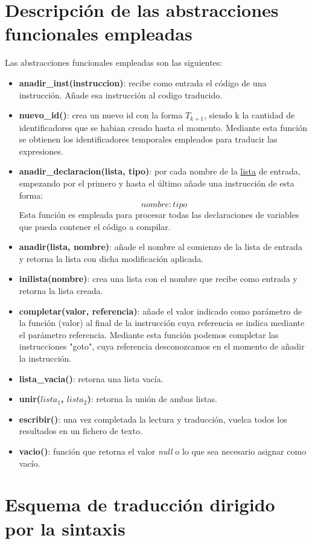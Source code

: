 \documentclass[12pt,a4paper,landscape]{article}
\theoremstyle{mytheor}
\begin{document}
\newpage
\section{Descripción de las abstracciones funcionales empleadas}
Las abstracciones funcionales empleadas son las siguientes:
\begin{itemize}
  \item \textbf{anadir\_inst(instruccion)}: recibe como entrada el código de una instrucción. Añade esa instrucción al codigo traducido.
  \item \textbf{nuevo\_id()}: crea un nuevo id con la forma $T_{k+1}$, siendo k la cantidad de identificadores que se habian creado hasta el momento. Mediante esta función se obtienen los identificadores temporales empleados para traducir las expresiones.
  \item \textbf{anadir\_declaracion(lista, tipo)}: por cada nombre de la \underline{lista} de entrada, empezando por el primero y hasta el último añade una instrucción de esta forma: \[nombre : tipo\] Esta función es empleada para procesar todas las declaraciones de variables que pueda contener el código a compilar.
  \item \textbf{anadir(lista, nombre)}: añade el nombre al comienzo de la lista de entrada y retorna la lista con dicha modificación aplicada.
  \item \textbf{inilista(nombre)}: crea una lista con el nombre que recibe como entrada y retorna la lista creada.
  \item \textbf{completar(valor, referencia)}: añade el valor indicado como parámetro de la función (valor) al final de la instrucción cuya referencia se indica mediante el parámetro referencia. Mediante esta función podemos completar las instrucciones "goto", cuya referencia desconozcamos en el momento de añadir la instrucción.
  \item \textbf{lista\_vacia()}: retorna una lista vacía.
  \item \textbf{unir($lista_1$, $lista_2$)}: retorna la unión de ambas listas.
  \item \textbf{escribir()}: una vez completada la lectura y traducción, vuelca todos los resultados en un fichero de texto.
  \item \textbf{vacio()}: función que retorna el valor \textit{null} o lo que sea necesario asignar como vacío.
\end{itemize}


\section{Esquema de traducción dirigido por la sintaxis}
\end{document}
